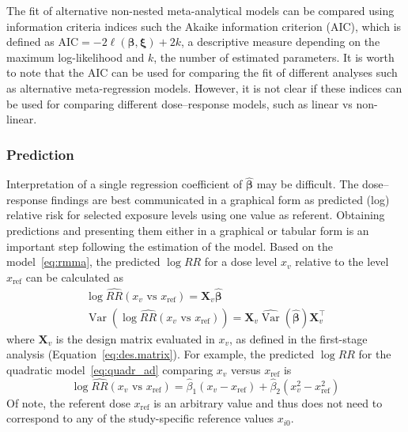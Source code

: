 \documentclass[11pt,a4paper,twoside,openany]{book}\usepackage{knitr}
\DeclareMathOperator{\Var}{Var}
\begin{document}
{{The fit of alternative non-nested meta-analytical models can be compared using information criteria indices such the Akaike information criterion (AIC), which is defined as $\textrm{AIC} = -2 \ell\left(\boldsymbol{\beta}, \boldsymbol{\xi} \right) + 2k$, a descriptive measure depending on the maximum log-likelihood and $k$, the number of estimated parameters. It is  worth to note that the AIC can be used for comparing the fit of different analyses such as alternative meta-regression models. However, it is not clear if these indices can be used for comparing different dose--response models, such as linear vs non-linear. 


\subsubsection*{Prediction}\label{sec:pred}

Interpretation of a single regression coefficient of $\boldsymbol{\hat \beta}$ may be difficult. The dose--response findings are best communicated in a graphical form as predicted (log) relative risk for selected exposure levels using one value as referent. Obtaining predictions and presenting them either in a graphical or tabular form is an important step following the estimation of the model.
Based on the model~\ref{eq:rmma}, the predicted $\log RR$ for a dose level $x_v$ relative to the level $x_\mathrm{ref}$ can be calculated as
\begin{align}
\log \widehat{RR}(x_v \text{ vs } x_\mathrm{ref}) = \mathbf{X}_v\boldsymbol{\hat \beta} \label{eq:pred} \\
\Var \left(\log \widehat{RR}(x_v \text{ vs } x_\mathrm{ref}) \right) = \mathbf{X}_v \widehat{\Var} \left( \boldsymbol{\hat \beta} \right) \mathbf{X}_v^\top \label{eq:varpred}
\end{align}
\noindent where $\mathbf{X}_v$ is the design matrix evaluated in $x_v$, as defined in the first-stage analysis (Equation~\ref{eq:des.matrix}). For example, the predicted $\log RR$ for the quadratic model~\ref{eq:quadr_ad} comparing $x_v$ versus $x_\mathrm{ref}$ is
\begin{equation*}
\log \widehat{RR}(x_v \text{ vs } x_\mathrm{ref}) = \hat \beta_1 \left(x_v - x_\mathrm{ref} \right) + \hat \beta_2 \left(x_v^2 - x_\mathrm{ref}^2 \right)
\end{equation*}
Of note, the referent dose $x_\mathrm{ref}$ is an arbitrary value and thus does not need to correspond to any of the study-specific reference values $x_{i0}$.

}}
\end{document}
